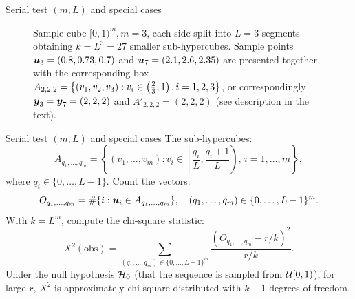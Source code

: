 \documentclass[aspectratio=169]{beamer}
\begin{document}
\begin{frame}{Serial test \((m,L)\) and special cases}
\begin{figure}[h]
\begin{center}
\caption{Sample cube $[0,1)^m, m=3$, each side split into $L=3$ segments obtaining $k=L^3=27$
smaller sub-hypercubes. Sample points  $\mbox{\boldmath$u$}_3=(0.8, 0.73, 0.7)$ and $\mbox{\boldmath$u$}_7=(2.1, 2.6, 2.35)$ are presented together with the corresponding box
$A_{2,2,2}=\left\{(v_1,v_2,v_3): v_i\in\left({2\over 3},1\right), i=1,2,3\right\}$, or correspondingly $\mbox{\boldmath$y$}_3=\mbox{\boldmath$y$}_7=(2,2,2)$ and $A'_{2,2,2}=(2,2,2)$ (see description in the text).}
\label{fig:cube_bins}
\end{center}
\end{figure}
\end{frame}

\begin{frame}{Serial test \((m,L)\) and special cases}
The sub-hypercubes:
\begin{equation}\label{eq:sub-hypercubes}
A_{q_1,\ldots,q_m}=\left\{(v_1,\ldots,v_m): v_i \in \left[\frac{q_i}{L},\frac{q_i+1}{L}\right), \, i=1,\ldots,m\right\},
\end{equation}
where \(q_i \in \{0,\ldots,L-1\}\).
 Count the vectors:
\[
O_{q_1,\ldots,q_m} = \#\{i : \mbox{\boldmath$u$}_i \in A_{q_1,\ldots,q_m}\}, \quad (q_1,\ldots,q_m) \in \{0,\ldots,L-1\}^m.
\]
With \(k = L^m\), compute the chi-square statistic:
\[
X^2(\text{obs}) = \sum_{(q_1,\ldots,q_m) \in \{0,\ldots,L-1\}^m} \frac{(O_{q_1,\ldots,q_m} - r/k)^2}{r/k}.
\]
 Under the null hypothesis \({\cal H}_0\) (that the sequence is sampled from \({\cal U}[0,1)\)), for large \(r\), \(X^2\) is approximately chi-square distributed with \(k-1\) degrees of freedom.
\end{frame}
\end{document}
